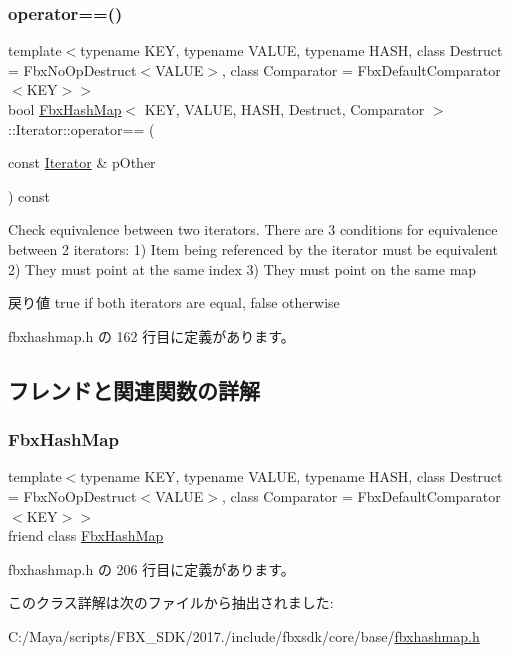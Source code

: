\subsubsection{\texorpdfstring{operator==()}{operator==()}}
{\footnotesize\ttfamily template$<$typename K\+EY, typename V\+A\+L\+UE, typename H\+A\+SH, class Destruct = Fbx\+No\+Op\+Destruct$<$\+V\+A\+L\+U\+E$>$, class Comparator = Fbx\+Default\+Comparator$<$\+K\+E\+Y$>$$>$ \\
bool \hyperlink{class_fbx_hash_map}{Fbx\+Hash\+Map}$<$ K\+EY, V\+A\+L\+UE, H\+A\+SH, Destruct, Comparator $>$\+::Iterator\+::operator== (\begin{DoxyParamCaption}\item[{const \hyperlink{class_fbx_hash_map_1_1_iterator}{Iterator} \&}]{p\+Other }\end{DoxyParamCaption}) const\hspace{0.3cm}{\ttfamily [inline]}}

Check equivalence between two iterators. There are 3 conditions for equivalence between 2 iterators\+: 1) Item being referenced by the iterator must be equivalent 2) They must point at the same index 3) They must point on the same map \begin{DoxyReturn}{戻り値}
true if both iterators are equal, false otherwise 
\end{DoxyReturn}


 fbxhashmap.\+h の 162 行目に定義があります。



\subsection{フレンドと関連関数の詳解}
\mbox{\label{class_fbx_hash_map_1_1_iterator_a58c051a31d06809f29f78fa92219181c}} 
\subsubsection{\texorpdfstring{Fbx\+Hash\+Map}{FbxHashMap}}
{\footnotesize\ttfamily template$<$typename K\+EY, typename V\+A\+L\+UE, typename H\+A\+SH, class Destruct = Fbx\+No\+Op\+Destruct$<$\+V\+A\+L\+U\+E$>$, class Comparator = Fbx\+Default\+Comparator$<$\+K\+E\+Y$>$$>$ \\
friend class \hyperlink{class_fbx_hash_map}{Fbx\+Hash\+Map}\hspace{0.3cm}{\ttfamily [friend]}}



 fbxhashmap.\+h の 206 行目に定義があります。



このクラス詳解は次のファイルから抽出されました\+:\begin{DoxyCompactItemize}
\item 
C\+:/\+Maya/scripts/\+F\+B\+X\+\_\+\+S\+D\+K/2017./include/fbxsdk/core/base/\hyperlink{fbxhashmap_8h}{fbxhashmap.\+h}\end{DoxyCompactItemize}
